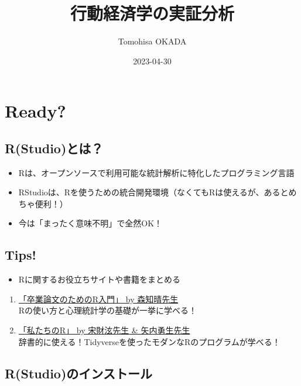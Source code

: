 \documentclass[
]{book}
\title{行動経済学の実証分析}
\author{Tomohisa OKADA}
\date{2023-04-30}
\providecommand{\tightlist}{%
  \setlength{\itemsep}{0pt}\setlength{\parskip}{0pt}}
\begin{document}
\maketitle

{
\setcounter{tocdepth}{1}
\tableofcontents
}
\hypertarget{ready}{%
\chapter{Ready?}\label{ready}}

\hypertarget{rstudioux3068ux306f}{%
\section{R(Studio)とは？}\label{rstudioux3068ux306f}}

\begin{itemize}
\tightlist
\item
  Rは、オープンソースで利用可能な統計解析に特化したプログラミング言語
\item
  RStudioは、Rを使うための統合開発環境（なくてもRは使えるが、あるとめちゃ便利！）\\
\item
  今は「まったく意味不明」で全然OK！
\end{itemize}

\hypertarget{tips}{%
\section{Tips!}\label{tips}}

\begin{itemize}
\tightlist
\item
  Rに関するお役立ちサイトや書籍をまとめる
\end{itemize}

\begin{enumerate}
\def\labelenumi{\arabic{enumi}.}
\item
  \href{https://tomoecon.github.io/R_for_graduate_thesis/}{「卒業論文のためのR入門」 by 森知晴先生}\\
  Rの使い方と心理統計学の基礎が一挙に学べる！
\item
  \href{https://www.jaysong.net/RBook/datahandling1.html}{「私たちのR」 by 宋財泫先生 \& 矢内勇生先生}\\
  辞書的に使える！Tidyverseを使ったモダンなRのプログラムが学べる！
\end{enumerate}

\hypertarget{rstudioux306eux30a4ux30f3ux30b9ux30c8ux30fcux30eb}{%
\section{R(Studio)のインストール}\label{rstudioux306eux30a4ux30f3ux30b9ux30c8ux30fcux30eb}}
\end{document}
